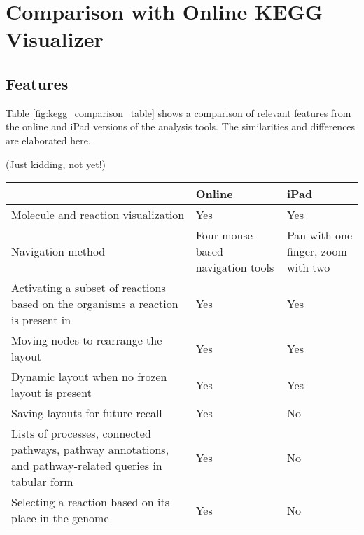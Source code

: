 \section{Comparison with Online KEGG Visualizer}
\label{sect:kegg_comparison}

\subsection{Features}
\label{sect:kegg_comparison_features}

Table \ref{fig:kegg_comparison_table} shows a comparison of relevant features
from the online and iPad versions of the \pathcasekegg analysis tools. The
similarities and differences are elaborated here.

(Just kidding, not yet!)

\begin{table}[ht!]
\centering
\begin{tabular}{ | p{3in} | p{1in} | p{1in} | }
    \hline
                        & Online    & iPad \\ \hline

    Molecule and reaction visualization
                        & Yes       & Yes \\ \hline

    Navigation method   & Four mouse-based navigation tools
                                    & Pan with one finger, zoom with two
                                    \\ \hline

    Activating a subset of reactions based on the organisms a reaction is
    present in
                        & Yes       & Yes \\ \hline

    Moving nodes to rearrange the layout
                        & Yes       & Yes \\ \hline

    Dynamic layout when no frozen layout is present
                        & Yes       & Yes \\ \hline

    Saving layouts for future recall
                        & Yes       & No \\ \hline

    Lists of processes, connected pathways, pathway annotations, and
    pathway-related queries in tabular form
                        & Yes       & No \\ \hline

    Selecting a reaction based on its place in the genome
                        & Yes       & No \\ \hline


\end{tabular}
\end{table}
